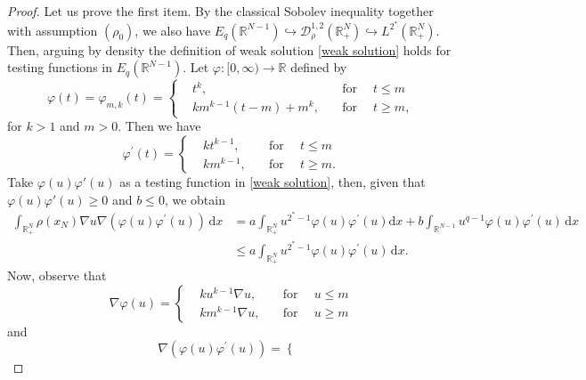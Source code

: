 \documentclass[10pt,a4paper]{amsart}
\begin{document}
\begin{proof} Let us prove the first item. By the classical Sobolev inequality together with assumption $(\rho_0)$, we also have $E_q(\mathds{R}^{N-1})\hookrightarrow \mathcal{D}^{1,2}_\rho(\mathds{R}^N_+)\hookrightarrow L^{2^\ast}(\mathds{R}^N_+)$. Then, arguing by density the definition of weak solution \eqref{weak solution} holds for testing functions in $E_q(\mathds{R}^{N-1})$. Let $\varphi:[0,\infty)\longrightarrow \mathds{R}$ defined by 
\begin{equation*}
    \varphi(t)= \varphi_{m,k}(t)=\left\lbrace
		\begin{aligned}
			&t^k,\quad&\mbox{for }&\,t\leq m\\
		&km^{k-1}(t-m)+m^k,\quad &\mbox{for}&\,t\geq m,
		\end{aligned}
		\right. 
\end{equation*}
for $k>1$ and $m>0$.
Then we have
\begin{equation*}
    \varphi^\prime(t)=\left\lbrace
		\begin{aligned}
			&kt^{k-1},\quad&\mbox{for }&\,t\leq m\\
		&km^{k-1},\quad &\mbox{for}&\,t\geq m.
		\end{aligned}
		\right. 
\end{equation*}
Take $\varphi(u)\varphi'(u)$ as a testing function in \eqref{weak solution}, then, given that $\varphi(u)\varphi'(u)\geq0$ and $b\leq 0$, we obtain 
\begin{align}\label{first inequality}
   \nonumber \int_{\mathds{R}^{N}_+}\rho(x_N)\nabla u \nabla (\varphi(u)\varphi^\prime(u)) \, \mathrm{d} x&=a\int_{\mathds{R}^{N}_+}u^{2^\ast-1}\varphi(u)\varphi^\prime(u) \mathrm{d}x  +b\int_{\mathds{R}^{N-1}}u^{q-1} \varphi(u)\varphi^\prime(u) \, \mathrm{d} x\\
    &\leq a\int_{\mathds{R}^{N}_+}u^{2^\ast-1} \varphi(u)\varphi^\prime(u) \, \mathrm{d} x.
\end{align}
Now, observe that
\begin{equation*}
    \nabla \varphi(u)=\left\lbrace
		\begin{aligned}
			&ku^{k-1}\nabla u,\quad&\mbox{for }&\,u\leq m\\
		&km^{k-1}\nabla u,\quad &\mbox{for}&\,u\geq m
		\end{aligned}
		\right. 
\end{equation*}
and
\begin{equation*}
    \nabla (\varphi(u)\varphi^\prime(u))=\left\lbrace
		\begin{aligned}

\end{aligned}
\end{equation*}
\end{proof}
\end{document}
